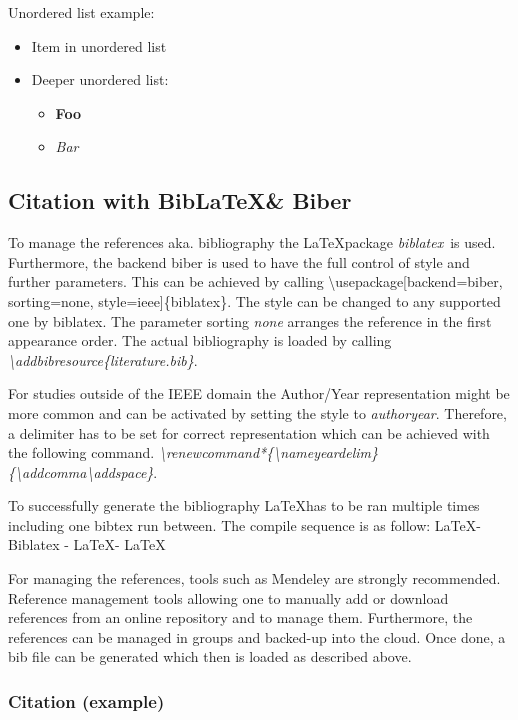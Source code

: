 Unordered list example:
\begin{itemize}
\item Item in unordered list
\item Deeper unordered list:
  \begin{itemize}
  \item \textbf{Foo}
  \item \textit{Bar}
  \end{itemize}
\end{itemize}


\subsection{Citation with Bib\LaTeX \& Biber}
To manage the references aka. bibliography the \LaTeX package \emph{biblatex} is used. Furthermore, the backend biber is used to have the full control of style and further parameters. This can be achieved by calling \textbackslash usepackage[backend=biber, sorting=none, style=ieee]\{biblatex\}. The style can be changed to any supported one by biblatex. The parameter sorting \emph{none} arranges the reference in the first appearance order. The actual bibliography is loaded by calling \emph{\textbackslash addbibresource\{literature.bib\}}.\par
For studies outside of the IEEE domain the Author/Year representation might be more common and can be activated by setting the style to \emph{authoryear}. Therefore, a delimiter has to be set for correct representation which can be achieved with the following command. \emph{\textbackslash renewcommand*\{\textbackslash nameyeardelim\}\{\textbackslash addcomma\textbackslash addspace\}}.\par
To successfully generate the bibliography \LaTeX has to be ran multiple times including one bibtex run between. The compile sequence is as follow: \LaTeX - Biblatex - \LaTeX - \LaTeX \par
For managing the references, tools such as Mendeley are strongly recommended. Reference management tools allowing one to manually add or download references from an online repository and to manage them. Furthermore, the references can be managed in groups and backed-up into the cloud. Once done, a bib file can be generated which then is loaded as described above.


\subsubsection{Citation (example)}

